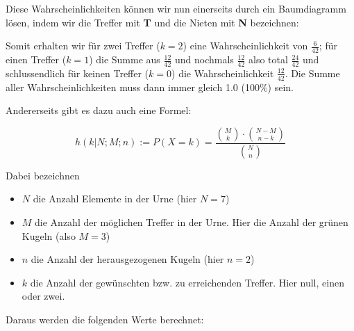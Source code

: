 Diese Wahrscheinlichkeiten können wir nun einerseits durch ein Baumdiagramm lösen, indem wir die Treffer mit \textbf{\color{green}T} und die Nieten mit \textbf{\color{red}N} bezeichnen:


Somit erhalten wir für zwei Treffer ($k=2$) eine Wahrscheinlichkeit von $\frac{6}{42}$; für einen Treffer ($k=1$) die Summe aus $\frac{12}{42}$ und nochmals $\frac{12}{42}$ also total $\frac{24}{42}$ und schlussendlich für keinen Treffer ($k=0$) die Wahrscheinlichkeit $\frac{12}{42}$.
Die Summe aller Wahrscheinlichkeiten muss dann immer gleich 1.0 (100\%) sein.
\newpage



Andererseits gibt es dazu auch eine Formel:

$$h(k|N;M;n) := P(X=k) = \frac{ {M\choose k} \cdot{} {{N-M}\choose {n-k}}}{{N \choose n}}$$

Dabei bezeichnen
\begin{itemize}
\item $N$ die Anzahl Elemente in der Urne (hier $N = 7$)
\item $M$ die Anzahl der möglichen Treffer in der Urne. Hier die Anzahl der grünen Kugeln (also $M = 3$)
\item $n$ die Anzahl der herausgezogenen Kugeln (hier $n = 2$)
\item $k$ die Anzahl der gewünschten bzw. zu erreichenden Treffer. Hier \zB null, einen oder zwei.
\end{itemize}
\newpage


Daraus werden die folgenden Werte berechnet:


